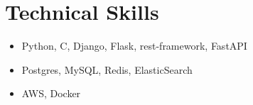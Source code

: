 
\section*{ Technical Skills}
\begin{center}
  \begin{itemize}[label=, itemsep=-3pt]
      \item Python, C, Django, Flask, rest-framework, FastAPI
      \item Postgres, MySQL, Redis, ElasticSearch
      \item AWS, Docker
  \end{itemize}
\end{center}

